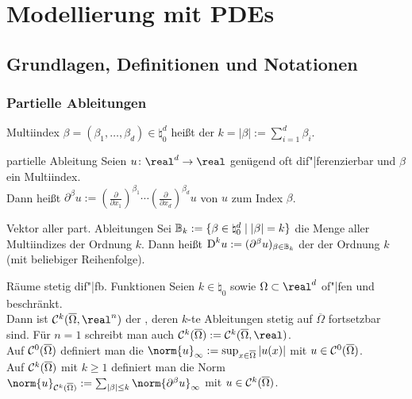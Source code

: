 \chapter{%
    Modellierung mit PDEs%
}

\section{%
    Grundlagen, Definitionen und Notationen%
}

\subsection{%
    Partielle Ableitungen%
}

\begin{Def}{Multiindex}
    $\beta = (\beta_1, \dotsc, \beta_d) \in \natural_0^d$ heißt  der
     $k = |\beta| := \sum_{i=1}^d \beta_i$.
\end{Def}

\begin{Def}{partielle Ableitung}
    Seien $u\colon \real^d \to \real$ genügend oft dif"|ferenzierbar und $\beta$ ein Multiindex.\\
    Dann heißt $\partial^\beta u := (\frac{\partial}{\partial x_1})^{\beta_1} \dotsm
    (\frac{\partial}{\partial x_d})^{\beta_d} u$  von $u$
    zum Index $\beta$.
\end{Def}

\begin{Def}{Vektor aller part. Ableitungen}
    Sei $\mathbb{B}_k := \{\beta \in \natural_0^d \;|\; |\beta| = k\}$ die Menge aller Multiindizes
    der Ordnung $k$.
    Dann heißt $\text{D}^k u := (\partial^\beta u)_{\beta \in \mathbb{B}_k}$ der
     der Ordnung $k$
    (mit beliebiger Reihenfolge).
\end{Def}

\begin{Def}{Räume stetig dif"|fb. Funktionen}
    Seien $k \in \natural_0$ sowie $\Omega \subset \real^d$ of"|fen und beschränkt.\\
    Dann ist $\C^k(\overline{\Omega}, \real^n)$ der
    ,
    deren $k$-te Ableitungen stetig auf $\overline{\Omega}$ fortsetzbar sind.
    Für $n = 1$ schreibt man auch $\C^k(\overline{\Omega}) := \C^k(\overline{\Omega}, \real)$.\\
    Auf $\mathcal{C}^0(\overline{\Omega})$ definiert man die 
    $\norm{u}_\infty := \sup_{x \in \overline{\Omega}} |u(x)|$ mit
    $u \in \mathcal{C}^0(\overline{\Omega})$.\\
    Auf $\mathcal{C}^k(\overline{\Omega})$ mit $k \ge 1$ definiert man die Norm
    $\norm{u}_{\C^k(\overline{\Omega})} := \sum_{|\beta| \le k} \norm{\partial^\beta u}_\infty$ mit
    $u \in \mathcal{C}^k(\overline{\Omega})$.
\end{Def}

